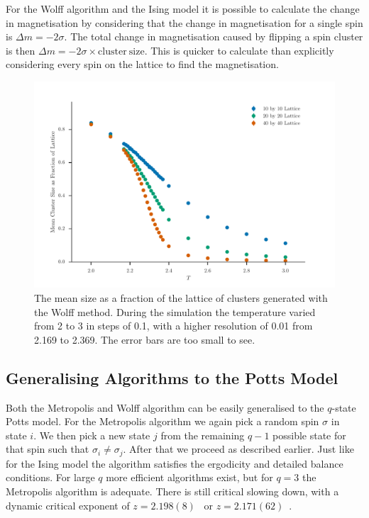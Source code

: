 \documentclass[11pt, a4paper]{report} %
\begin{document}
For the Wolff algorithm and the Ising model it is possible to calculate the change in magnetisation by considering that the change in magnetisation for a single spin is \(\Delta m = -2 \sigma\).
The total change in magnetisation caused by flipping a spin cluster is then \(\Delta m = -2 \sigma \times \mathrm{cluster\ size}\).
This is quicker to calculate than explicitly considering every spin on the lattice to find the magnetisation.

\begin{figure}[htb]
	\centering
	\includegraphics[width=\linewidth]{wolff_mean_cluster_size_as_fraction_of_lattice.pdf}
	\caption{The mean size as a fraction of the lattice of clusters generated with the Wolff method. During the simulation the temperature varied from 2 to 3 in steps of 0.1, with a higher resolution of 0.01 from 2.169 to 2.369. The error bars are too small to see.}
	\label{fig:wolff_cluster_size}
\end{figure}

\subsection{Generalising Algorithms to the Potts Model}
Both the Metropolis and Wolff algorithm can be easily generalised to the \(q\)-state Potts model.
For the Metropolis algorithm we again pick a random spin \(\sigma\) in state \(i\).
We then pick a new state \(j\) from the remaining \(q-1\) possible state for that spin such that \(\sigma_i \neq \sigma_j\).
After that we proceed as described earlier.
Just like for the Ising model the algorithm satisfies the ergodicity and detailed balance conditions.
For large \(q\) more efficient algorithms exist, but for \(q=3\) the Metropolis algorithm is adequate.
There is still critical slowing down, with a dynamic critical exponent of \(z=2.198(8)\)~\cite{newman:1999} or \(z=2.171(62)\)~\cite{fan:2007}.
\end{document}
